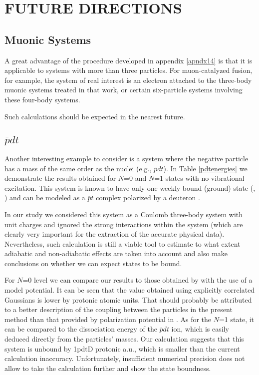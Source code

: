 \chapter{FUTURE DIRECTIONS\label{future}}

\section{Muonic Systems}

A great advantage of the procedure developed in appendix \ref{apndx14} 
is that it is applicable to systems with more than three particles. 
For muon-catalyzed fusion, 
for example, the system of real interest is an electron attached 
to the three-body muonic systems treated in that work, 
or certain six-particle systems involving these four-body systems.

Such calculations should be expected in the nearest future.

\section{$\overline{p}dt$}

Another interesting example to consider is a system where
the negative particle has a mass of the same order as the
nuclei (e.g., $\overline{p}dt$). In Table \ref{pdtenergies}
we demonstrate the results obtained for $N$=0 and $N$=1 
states with no vibrational excitation. This system is known
to have only one weekly bound (ground) state 
(\cite{pdt_N1_1}, \cite{pdt_N1_2}) and can be modeled as a
$\overline{p}t$ complex polarized by a deuteron \cite{frolov_pdt}.

In our study we considered this system as a Coulomb
three-body system with unit charges and ignored the 
strong interactions within the system (which are clearly
very important for the extraction of the accurate physical data).
Nevertheless, such calculation is still a viable tool
to estimate to what extent adiabatic and non-adiabatic effects
are taken into account and also make conclusions on 
whether we can expect states to be bound.
 
For $N$=0 level we can compare our results to those obtained
by \cite{frolov_pdt} with the use of a model potential.
It can be seen that the value obtained using explicitly 
correlated Gaussians is lower by \NpdtD  protonic atomic
units. That should probably be attributed to a better 
description of the coupling between the particles 
in the present method than that provided by polarization
potential in \cite{frolov_pdt}. As for the $N$=1 state,
it can be compared to the dissociation energy of the
$\overline{p}dt$ ion, which is easily deduced directly
from the particles' masses. Our calculation suggests that this
system is unbound by \N1pdtD protonic a.u., which
is smaller than the current calculation inaccuracy.
Unfortunately, insufficient numerical precision 
does not allow to take the calculation further and show
the state boundness. 

